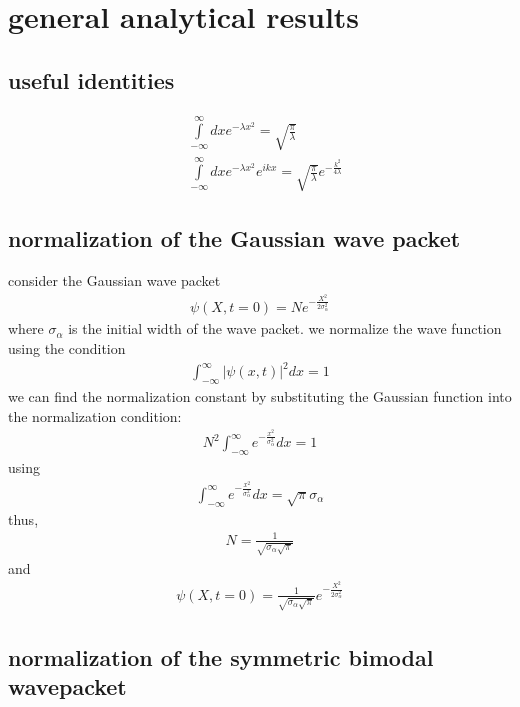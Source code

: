 \section{general analytical results}

\subsection{useful identities}
\begin{align}
     & \int\limits_{-\infty}^{\infty}dx e^{-\lambda x^2} = \sqrt{\frac{\pi}{\lambda}}\label{usefulid1}                                     \\
     & \int\limits_{-\infty}^{\infty}dx  e^{-\lambda x^2} e^{ikx}  = \sqrt{\frac{\pi}{\lambda}} e^{-\frac{k^2}{4\lambda}}\label{usefulid2}
\end{align}

\subsection{normalization of the Gaussian wave packet}

consider the Gaussian wave packet
\begin{align}
    \psi(X,t=0) = N e^{-\frac{X^2}{2\sigma_\alpha^2}}
\end{align}
where $\sigma_\alpha$ is the initial width of the wave packet. we normalize the wave function using the condition
\begin{align}
    \int_{-\infty}^{\infty} |\psi(x,t)|^2 dx = 1
\end{align}
we can find the normalization constant by substituting the Gaussian function into the normalization condition:
\begin{align}
    N^2 \int_{-\infty}^{\infty} e^{-\frac{x^2}{\sigma_\alpha^2}} dx = 1
\end{align}
using
\begin{align}
    \int_{-\infty}^{\infty} e^{-\frac{x^2}{\sigma_\alpha^2}} dx = \sqrt{\pi}\sigma_\alpha
\end{align}
thus,
\begin{align}
    N = \frac{1}{\sqrt{\sigma_\alpha\sqrt{\pi}}}
\end{align}
and
\begin{align}
    \psi(X,t=0) = \frac{1}{\sqrt{\sigma_\alpha\sqrt{\pi}}}e^{-\frac{X^2}{2\sigma_\alpha^2}}
\end{align}

\subsection{normalization of the symmetric bimodal wavepacket}\label{sect_bimodal}

